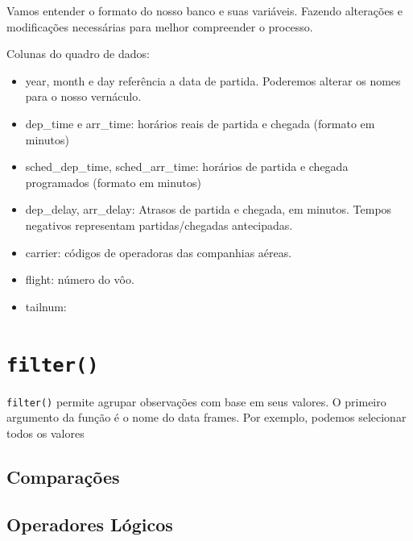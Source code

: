 \documentclass[]{book}
\newenvironment{Shaded}{\begin{snugshade}}{\end{snugshade}}
\newcommand{\DataTypeTok}[1]{\textcolor[rgb]{0.13,0.29,0.53}{#1}}
\newcommand{\KeywordTok}[1]{\textcolor[rgb]{0.13,0.29,0.53}{\textbf{#1}}}
\newcommand{\NormalTok}[1]{#1}
\newcommand{\OperatorTok}[1]{\textcolor[rgb]{0.81,0.36,0.00}{\textbf{#1}}}
\newcommand{\StringTok}[1]{\textcolor[rgb]{0.31,0.60,0.02}{#1}}
\begin{document}
Vamos entender o formato do nosso banco e suas variáveis. Fazendo alterações e modificações necessárias para melhor compreender o processo.

Colunas do quadro de dados:

\begin{itemize}
\item
  year, month e day referência a data de partida. Poderemos alterar os nomes para o nosso vernáculo.
\item
  dep\_time e arr\_time: horários reais de partida e chegada (formato em minutos)
\item
  sched\_dep\_time, sched\_arr\_time: horários de partida e chegada programados (formato em minutos)
\item
  dep\_delay, arr\_delay: Atrasos de partida e chegada, em minutos. Tempos negativos representam partidas/chegadas antecipadas.
\item
  carrier: códigos de operadoras das companhias aéreas.
\item
  flight: número do vôo.
\item
  tailnum:
\end{itemize}

\begin{Shaded}
\end{Shaded}

\hypertarget{filter-1}{%
\section{\texorpdfstring{\texttt{filter()}}{filter()}}\label{filter-1}}

\texttt{filter()} permite agrupar observações com base em seus valores. O primeiro argumento da função é o nome do data frames. Por exemplo, podemos selecionar todos os valores

\hypertarget{comparacoes}{%
\subsection{Comparações}\label{comparacoes}}

\hypertarget{operadores-logicos}{%
\subsection{Operadores Lógicos}\label{operadores-logicos}}
\end{document}
